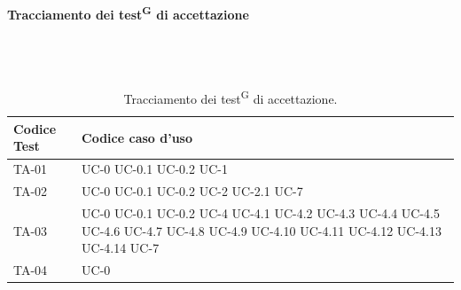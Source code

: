 \documentclass[8pt]{article}
\newcommand{\glossterm}[1]{#1\textsuperscript{G}} %
\newcommand{\subsubsubsection}[1]{\paragraph{#1}\mbox{}\\\\}
\begin{document}
\clearpage
\subsubsubsection{Tracciamento dei \glossterm{test} di accettazione}
\renewcommand{\arraystretch}{2.5}
\begin{longtable}{|>{\centering}p{4cm}|>{\centering\arraybackslash}p{4cm}|}
\hline
\rowcolor{white}
\textbf{Codice Test} & \textbf{Codice caso d'uso} \\
\hline
\endfirsthead
\rowcolor{white}
\caption{Tracciamento dei \glossterm{test} di accettazione.}
\label{table:Tracciamento dei test di accettazione}
\endlastfoot
    TA-01 & UC-0 \newline
            UC-0.1 \newline
            UC-0.2 \newline
            UC-1  
    \\
    \hline
    TA-02 & UC-0 \newline
            UC-0.1 \newline
            UC-0.2 \newline
            UC-2 \newline
            UC-2.1 \newline
            UC-7
    \\
    \hline 
    TA-03 & UC-0 \newlineUC-0 \newline
            UC-0.1 \newline
            UC-0.2 \newline
            UC-4 \newline
            UC-4.1 \newline
            UC-4.2 \newline
            UC-4.3 \newline
            UC-4.4 \newline
            UC-4.5 \newline
            UC-4.6 \newline
            UC-4.7 \newline
            UC-4.8 \newline
            UC-4.9 \newline
            UC-4.10 \newline
            UC-4.11 \newline
            UC-4.12 \newline
            UC-4.13 \newline
            UC-4.14 \newline
            UC-7
    \\
    \hline
    TA-04 & UC-0 \newline

\end{longtable}
\end{document}
